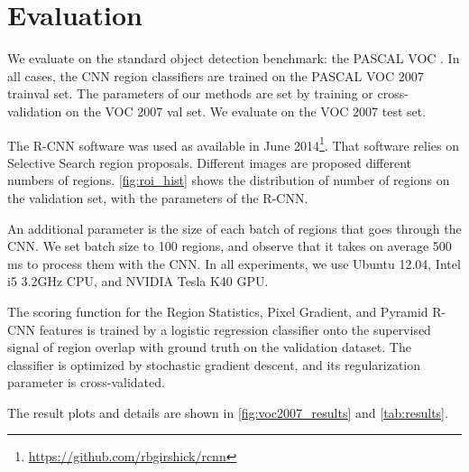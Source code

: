 \section{Evaluation}\label{sec:evaluation}

We evaluate on the standard object detection benchmark: the PASCAL VOC \cite{pascal-voc-2010}.
In all cases, the CNN region classifiers are trained on the PASCAL VOC 2007 trainval set.
The parameters of our methods are set by training or cross-validation on the VOC 2007 val set.
We evaluate on the VOC 2007 test set.

The R-CNN software was used as available in June 2014\footnote{\url{https://github.com/rbgirshick/rcnn}}.
That software relies on Selective Search \cite{Uijlings-IJCV-2013} region proposals.
Different images are proposed different numbers of regions.
\autoref{fig:roi_hist} shows the distribution of number of regions on the validation set, with the parameters of the R-CNN.

An additional parameter is the size of each batch of regions that goes through the CNN.
We set batch size to 100 regions, and observe that it takes on average 500 ms to process them with the CNN.
In all experiments, we use Ubuntu 12.04, Intel i5 3.2GHz CPU, and NVIDIA Tesla K40 GPU.

The scoring function for the Region Statistics, Pixel Gradient, and Pyramid R-CNN features is trained by a logistic regression classifier onto the supervised signal of region overlap with ground truth on the validation dataset.
The classifier is optimized by stochastic gradient descent, and its regularization parameter is cross-validated.

The result plots and details are shown in \autoref{fig:voc2007_results} and \autoref{tab:results}.

